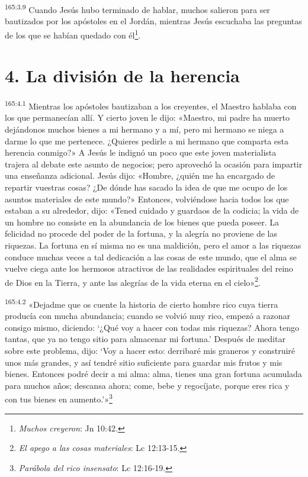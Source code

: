 \par
\textsuperscript{165:3.9} Cuando Jesús hubo terminado de hablar, muchos salieron para ser bautizados por los apóstoles en el Jordán, mientras Jesús escuchaba las preguntas de los que se habían quedado con él\footnote{\textit{Muchos creyeron}: Jn 10:42.}.

\section*{4. La división de la herencia}
\par
\textsuperscript{165:4.1} Mientras los apóstoles bautizaban a los creyentes, el Maestro hablaba con los que permanecían allí. Y cierto joven le dijo: «Maestro, mi padre ha muerto dejándonos muchos bienes a mi hermano y a mí, pero mi hermano se niega a darme lo que me pertenece. ¿Quieres pedirle a mi hermano que comparta esta herencia conmigo?» A Jesús le indignó un poco que este joven materialista trajera al debate este asunto de negocios; pero aprovechó la ocasión para impartir una enseñanza adicional. Jesús dijo: «Hombre, ¿quién me ha encargado de repartir vuestras cosas? ¿De dónde has sacado la idea de que me ocupo de los asuntos materiales de este mundo?» Entonces, volviéndose hacia todos los que estaban a su alrededor, dijo: «Tened cuidado y guardaos de la codicia; la vida de un hombre no consiste en la abundancia de los bienes que pueda poseer. La felicidad no procede del poder de la fortuna, y la alegría no proviene de las riquezas. La fortuna en sí misma no es una maldición, pero el amor a las riquezas conduce muchas veces a tal dedicación a las cosas de este mundo, que el alma se vuelve ciega ante los hermosos atractivos de las realidades espirituales del reino de Dios en la Tierra, y ante las alegrías de la vida eterna en el cielo»\footnote{\textit{El apego a las cosas materiales}: Lc 12:13-15.}.

\par
\textsuperscript{165:4.2} «Dejadme que os cuente la historia de cierto hombre rico cuya tierra producía con mucha abundancia; cuando se volvió muy rico, empezó a razonar consigo mismo, diciendo: `¿Qué voy a hacer con todas mis riquezas? Ahora tengo tantas, que ya no tengo sitio para almacenar mi fortuna.' Después de meditar sobre este problema, dijo: `Voy a hacer esto: derribaré mis graneros y construiré unos más grandes, y así tendré sitio suficiente para guardar mis frutos y mis bienes. Entonces podré decir a mi alma: alma, tienes una gran fortuna acumulada para muchos años; descansa ahora; come, bebe y regocíjate, porque eres rica y con tus bienes en aumento.'»\footnote{\textit{Parábola del rico insensato}: Lc 12:16-19.}


